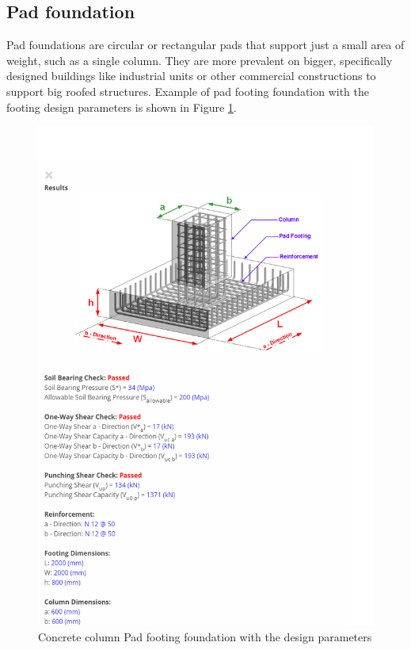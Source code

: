 {\subsection{Pad foundation}
Pad foundations are circular or rectangular pads that support just a small area of weight, such as a single column. They are more prevalent on bigger, specifically designed buildings like industrial units or other commercial constructions to support big roofed structures. Example of pad footing foundation with the footing design parameters is shown in Figure \ref{fig:3.21}.


\begin{figure}
    \centering
\includegraphics[width=6in]{Figures/tap foundation design2.png}
\caption{Concrete column Pad footing foundation with the design parameters}
 \label{fig:3.21}
\end{figure}



}
